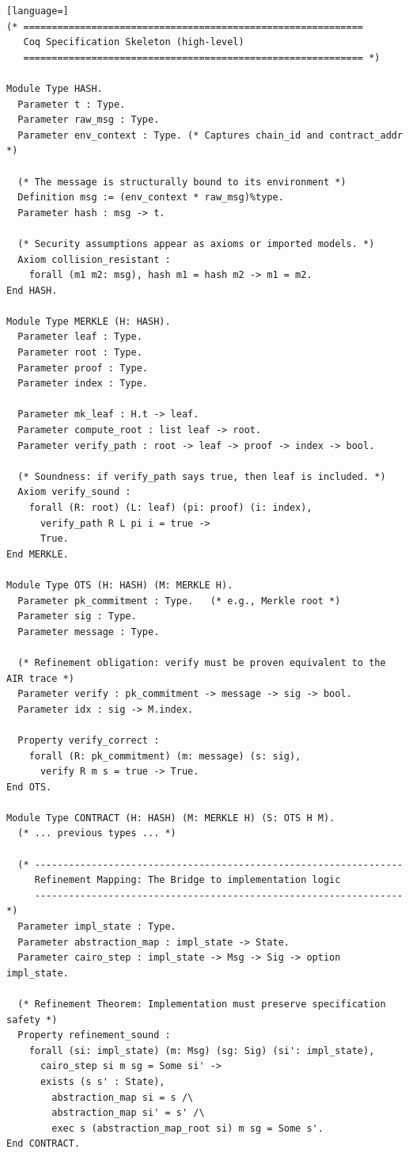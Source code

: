 \documentclass[conference]{IEEEtran}
\theoremstyle{definition}
\theoremstyle{plain}
\theoremstyle{remark}
\begin{document}
\begin{lstlisting}[language=]
(* ============================================================
   Coq Specification Skeleton (high-level)
   ============================================================ *)

Module Type HASH.
  Parameter t : Type.
  Parameter raw_msg : Type.
  Parameter env_context : Type. (* Captures chain_id and contract_addr *)
  
  (* The message is structurally bound to its environment *)
  Definition msg := (env_context * raw_msg)%type.
  Parameter hash : msg -> t.

  (* Security assumptions appear as axioms or imported models. *)
  Axiom collision_resistant :
    forall (m1 m2: msg), hash m1 = hash m2 -> m1 = m2.
End HASH.

Module Type MERKLE (H: HASH).
  Parameter leaf : Type.
  Parameter root : Type.
  Parameter proof : Type.
  Parameter index : Type.

  Parameter mk_leaf : H.t -> leaf.
  Parameter compute_root : list leaf -> root.
  Parameter verify_path : root -> leaf -> proof -> index -> bool.

  (* Soundness: if verify_path says true, then leaf is included. *)
  Axiom verify_sound :
    forall (R: root) (L: leaf) (pi: proof) (i: index),
      verify_path R L pi i = true ->
      True.
End MERKLE.

Module Type OTS (H: HASH) (M: MERKLE H).
  Parameter pk_commitment : Type.   (* e.g., Merkle root *)
  Parameter sig : Type.
  Parameter message : Type.

  (* Refinement obligation: verify must be proven equivalent to the AIR trace *)
  Parameter verify : pk_commitment -> message -> sig -> bool.
  Parameter idx : sig -> M.index.

  Property verify_correct :
    forall (R: pk_commitment) (m: message) (s: sig),
      verify R m s = true -> True.
End OTS.

Module Type CONTRACT (H: HASH) (M: MERKLE H) (S: OTS H M).
  (* ... previous types ... *)

  (* -----------------------------------------------------------------
     Refinement Mapping: The Bridge to implementation logic
     ----------------------------------------------------------------- *)
  Parameter impl_state : Type.
  Parameter abstraction_map : impl_state -> State.
  Parameter cairo_step : impl_state -> Msg -> Sig -> option impl_state.

  (* Refinement Theorem: Implementation must preserve specification safety *)
  Property refinement_sound :
    forall (si: impl_state) (m: Msg) (sg: Sig) (si': impl_state),
      cairo_step si m sg = Some si' ->
      exists (s s' : State),
        abstraction_map si = s /\
        abstraction_map si' = s' /\
        exec s (abstraction_map_root si) m sg = Some s'.
End CONTRACT.
\end{lstlisting}
\end{document}
